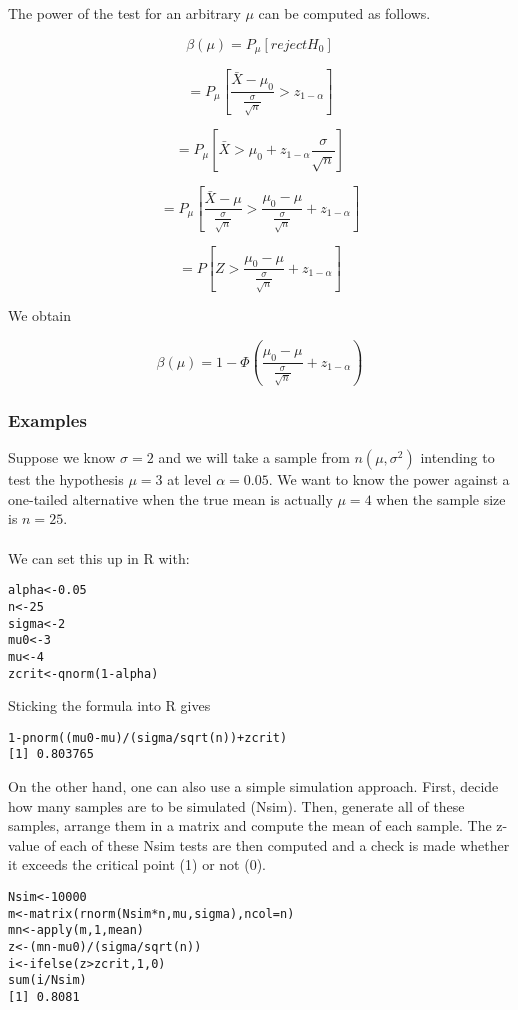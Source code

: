 \documentclass[12pt,a4paper]{article}
\theoremstyle{regla}
\theoremstyle{remark}
\theoremstyle{definition}
\theoremstyle{nonumberbreak}
\begin{document}
The power of the test for an arbitrary $\mu $ can be computed as follows.
 
 $$\beta(\mu) = P_{\mu} [reject H_0]$$

 $$= P_{\mu}[\frac{\bar {X} - \mu_0}{\frac{\sigma} {\sqrt{n}}} > z_{1- \alpha}]$$

 $$= P_{\mu} [\bar {X}> \mu_0 + z_{1- \alpha}{\frac{\sigma} {\sqrt{n}}}]$$

$$= P_{\mu} [\frac{\bar {X} - \mu}{\frac{\sigma} {\sqrt{n}}}> \frac{\mu_0 - \mu }{\frac{\sigma} {\sqrt{n}}}+ z_{1- \alpha}]$$

$$ = P[Z > \frac{\mu_0 - \mu}{\frac{\sigma} {\sqrt{n}}} + z_{1- \alpha}]$$

We obtain

$$
\beta(\mu) = 1 - \Phi \left ( \frac{\mu_0 - \mu }{\frac{\sigma} {\sqrt{n}}} + z_{1- \alpha} \right )
$$


\subsubsection{Examples}
\begin{xmpl}
Suppose we know $\sigma=2$ and we will take a sample 
from $n\left ( \mu, \sigma^2\right)$
intending to test the hypothesis $\mu=3$ at level $\alpha=0.05$. We want to know the power
against a one-tailed alternative when the true mean is actually $\mu=4$ when the sample size is $n=25$. \\\\

We can set this up in R with:
\begin{lstlisting}
alpha<-0.05
n<-25
sigma<-2
mu0<-3
mu<-4
zcrit<-qnorm(1-alpha)
\end{lstlisting}


Sticking the formula into R gives
\begin{lstlisting}
1-pnorm((mu0-mu)/(sigma/sqrt(n))+zcrit)
[1] 0.803765
\end{lstlisting}

On the other hand, one can also use a simple simulation approach. First, decide how many samples are to be simulated (Nsim). Then, generate all of these samples, arrange them in a matrix and compute the mean of each sample.  The z-value of each of these Nsim tests are then computed and a check is made whether it exceeds the critical point (1) or not (0).\\
\begin{lstlisting}
Nsim<-10000
m<-matrix(rnorm(Nsim*n,mu,sigma),ncol=n)
mn<-apply(m,1,mean)
z<-(mn-mu0)/(sigma/sqrt(n))
i<-ifelse(z>zcrit,1,0)
sum(i/Nsim)
[1] 0.8081
\end{lstlisting}
\end {xmpl}
\end{document}
